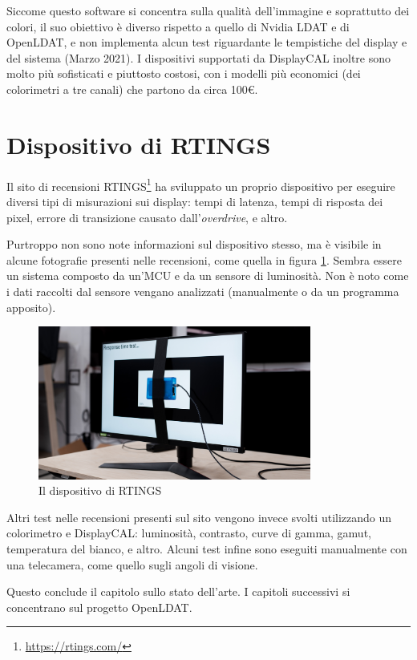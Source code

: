 Siccome questo software si concentra sulla qualità dell'immagine e soprattutto dei colori, il suo obiettivo è diverso rispetto a quello di Nvidia LDAT e di OpenLDAT, e non implementa alcun test riguardante le tempistiche del display e del sistema (Marzo 2021). I dispositivi supportati da DisplayCAL inoltre sono molto più sofisticati e piuttosto costosi, con i modelli più economici (dei colorimetri a tre canali) che partono da circa 100€.

\section{Dispositivo di RTINGS}
Il sito di recensioni RTINGS\footnote{\url{https://rtings.com/}} ha sviluppato un proprio dispositivo per eseguire diversi tipi di misurazioni sui display: tempi di latenza, tempi di risposta dei pixel, errore di transizione causato dall'\textit{overdrive}, e altro.

Purtroppo non sono note informazioni sul dispositivo stesso, ma è visibile in alcune fotografie presenti nelle recensioni, come quella in figura \ref{fig:rtings_device}. Sembra essere un sistema composto da un'MCU e da un sensore di luminosità. Non è noto come i dati raccolti dal sensore vengano analizzati (manualmente o da un programma apposito).

\begin{figure}[h!]
	\centering
	\includegraphics[width=0.8\textwidth]{StatoDellArte_files/rtings_device.jpg}
	\caption{Il dispositivo di RTINGS}
	\label{fig:rtings_device}
\end{figure}

Altri test nelle recensioni presenti sul sito vengono invece svolti utilizzando un colorimetro e DisplayCAL: luminosità, contrasto, curve di gamma, gamut, temperatura del bianco, e altro. Alcuni test infine sono eseguiti manualmente con una telecamera, come quello sugli angoli di visione.

Questo conclude il capitolo sullo stato dell'arte. I capitoli successivi si concentrano sul progetto OpenLDAT.
